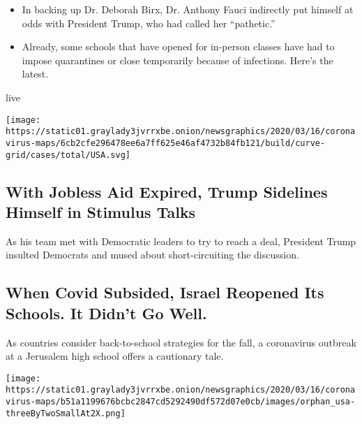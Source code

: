 \begin{itemize}
\tightlist
\item
  In backing up Dr. Deborah Birx, Dr. Anthony Fauci indirectly put
  himself at odds with President Trump, who had called her ``pathetic.''
\item
  Already, some schools that have opened for in-person classes have had
  to impose quarantines or close temporarily because of infections.
  Here's the latest.
\end{itemize}

live

\texttt{[image: https://static01.graylady3jvrrxbe.onion/newsgraphics/2020/03/16/coronavirus-maps/6cb2cfe296478ee6a7ff625e46af4732b84fb121/build/curve-grid/cases/total/USA.svg]}

\href{/2020/08/03/us/politics/congress-jobless-aid-talks-trump.html}{}

\hypertarget{with-jobless-aid-expired-trump-sidelines-himself-in-stimulus-talks}{%
\subsection{With Jobless Aid Expired, Trump Sidelines Himself in
Stimulus
Talks}\label{with-jobless-aid-expired-trump-sidelines-himself-in-stimulus-talks}}

As his team met with Democratic leaders to try to reach a deal,
President Trump insulted Democrats and mused about short-circuiting the
discussion.

\href{/2020/08/04/world/middleeast/coronavirus-israel-schools-reopen.html}{}

\hypertarget{when-covid-subsided-israel-reopened-its-schools-it-didnt-go-well}{%
\subsection{When Covid Subsided, Israel Reopened Its Schools. It Didn't
Go
Well.}\label{when-covid-subsided-israel-reopened-its-schools-it-didnt-go-well}}

As countries consider back-to-school strategies for the fall, a
coronavirus outbreak at a Jerusalem high school offers a cautionary
tale.

\texttt{[image: https://static01.graylady3jvrrxbe.onion/newsgraphics/2020/03/16/coronavirus-maps/b51a1199676bcbc2847cd5292490df572d07e0cb/images/orphan\_usa-threeByTwoSmallAt2X.png]}

\href{/2020/08/03/nyregion/donald-trump-taxes-cyrus-vance.html}{}

